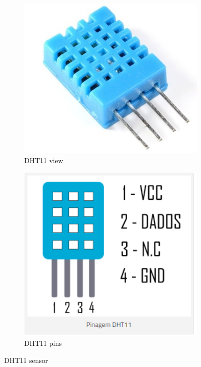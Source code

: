 \begin{figure}[h]
\centering

    \begin{subfigure}[b]{0.2\textwidth}
		\includegraphics[width=\textwidth]{figs/dht11}
		\caption{DHT11 view}
		\label{fig-dht11}
    \end{subfigure}
    \begin{subfigure}[b]{0.2\textwidth}
	\includegraphics[width=\textwidth]{figs/dht11-pinagem}
	\caption{DHT11 pins}
	\label{fig-dht11-1}
    \end{subfigure}
	\caption{DHT11 sensor}
\end{figure}


